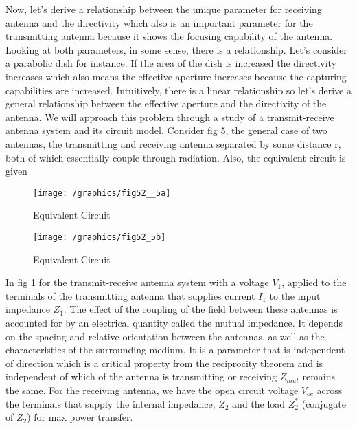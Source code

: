 Now, let's derive a relationship between the unique parameter for receiving antenna and the directivity which also is an important parameter for the transmitting antenna because it shows the focusing capability of the antenna. Looking at both parameters, in some sense, there is a relationship. Let's consider a parabolic dish for instance. If the area of the dish is increased the directivity increases which also means the effective aperture increases because the capturing capabilities are increased. Intuitively, there is a linear relationship so let's derive a general relationship between the effective aperture and the directivity of the antenna. We will approach this problem through a study of a transmit-receive antenna system and its circuit model. Consider fig 5, the general case of two antennas, the transmitting and receiving antenna separated by some distance r, both of which essentially couple through radiation. Also, the equivalent circuit is given
\begin{figure}[h]
\texttt{[image: /graphics/fig52\_\_5a]}
\centering
\caption{Equivalent Circuit}
\label{fig5b}	
\end{figure}

\begin{figure}[h]
\texttt{[image: /graphics/fig52\_5b]}
\centering
\caption{Equivalent Circuit}
\label{fig 1}	
\end{figure}

In fig \ref{fig5b} for the transmit-receive antenna system with a voltage $V_1$, applied to the terminals of the transmitting antenna that supplies current $I_{1}$ to the input impedance $Z_{1}$. The effect of the coupling of the field between these antennas is accounted for by an electrical quantity called the mutual impedance. It depends on the spacing and relative orientation between the antennas, as well as the characteristics of the surrounding medium. It is a parameter that is independent of direction which is a critical property from the reciprocity theorem and is independent of which of the antenna is transmitting or receiving $Z_{mut}$ remains the same. For the receiving antenna, we have the open circuit voltage $V_{oc}$ across the terminals that supply the internal impedance, $Z_{2}$ and the load $Z_{2}^*$ (conjugate of $Z_{2}$) for max power transfer.

